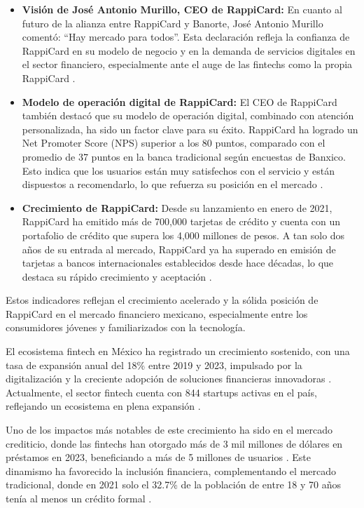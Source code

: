 \begin{itemize}
    \item \textbf{Visión de José Antonio Murillo, CEO de RappiCard:} En cuanto al futuro de la alianza entre RappiCard y Banorte, José Antonio Murillo comentó: “Hay mercado para todos”. Esta declaración refleja la confianza de RappiCard en su modelo de negocio y en la demanda de servicios digitales en el sector financiero, especialmente ante el auge de las fintechs como la propia RappiCard \cite{forbesrappibanorte}.
    \item \textbf{Modelo de operación digital de RappiCard:} El CEO de RappiCard también destacó que su modelo de operación digital, combinado con atención personalizada, ha sido un factor clave para su éxito. RappiCard ha logrado un Net Promoter Score (NPS) superior a los 80 puntos, comparado con el promedio de 37 puntos en la banca tradicional según encuestas de Banxico. Esto indica que los usuarios están muy satisfechos con el servicio y están dispuestos a recomendarlo, lo que refuerza su posición en el mercado \cite{forbesrappibanorte}.
    \item \textbf{Crecimiento de RappiCard:} Desde su lanzamiento en enero de 2021, RappiCard ha emitido más de 700,000 tarjetas de crédito y cuenta con un portafolio de crédito que supera los 4,000 millones de pesos. A tan solo dos años de su entrada al mercado, RappiCard ya ha superado en emisión de tarjetas a bancos internacionales establecidos desde hace décadas, lo que destaca su rápido crecimiento y aceptación \cite{forbesrappibanorte}.
\end{itemize}

Estos indicadores reflejan el crecimiento acelerado y la sólida posición de RappiCard en el mercado financiero mexicano, especialmente entre los consumidores jóvenes y familiarizados con la tecnología.

\vspace{0.3cm}

El ecosistema fintech en México ha registrado un crecimiento sostenido, con una tasa de expansión anual del 18\% entre 2019 y 2023, impulsado por la digitalización y la creciente adopción de soluciones financieras innovadoras \cite{dock2024}. Actualmente, el sector fintech cuenta con 844 startups activas en el país, reflejando un ecosistema en plena expansión \cite{finnovating2024}.

\vspace{0.3cm}

Uno de los impactos más notables de este crecimiento ha sido en el mercado crediticio, donde las fintechs han otorgado más de 3 mil millones de dólares en préstamos en 2023, beneficiando a más de 5 millones de usuarios \cite{uflow2024}. Este dinamismo ha favorecido la inclusión financiera, complementando el mercado tradicional, donde en 2021 solo el 32.7\% de la población de entre 18 y 70 años tenía al menos un crédito formal \cite{inegi2021}.

